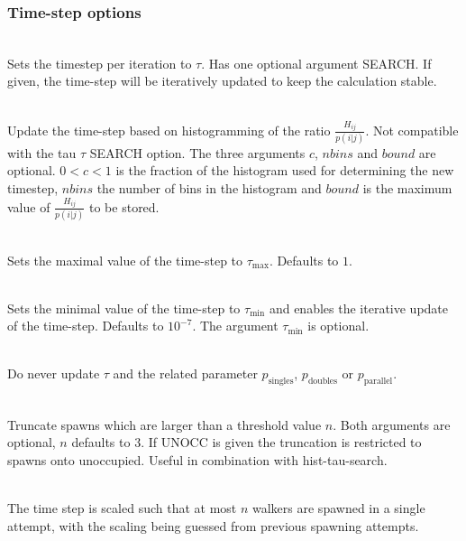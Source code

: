 \documentclass[a4paper,notitlepage,dvipsnames]{scrreprt}
\newcommand\codeitem[1]{\needspace{1.5\baselineskip}\item[\textnormal{\ttfamily #1 \nopagebreak}] \hfill \\ \nopagebreak}
\begin{document}
  \subsubsection{Time-step options}
  \begin{description}
    \codeitem{\textcolor{mred}{tau $\tau$} SEARCH}
    Sets the timestep per iteration to $\tau$. Has one optional argument
    SEARCH. If given, the time-step will be iteratively updated to keep the
    calculation stable.
    \codeitem{\textcolor{oblue}{hist-tau-search $c$ $nbins$ $bound$}}
    Update the time-step based on histogramming of the ratio
    $\frac{H_{ij}}{p(i|j)}$. Not compatible with the tau $\tau$ SEARCH
    option. The three arguments $c$, $nbins$ and $bound$ are
    optional. $0<c<1$ is the fraction of the histogram used for determining
    the new timestep, $nbins$ the number of bins in the histogram and $bound$
    is the maximum value of $\frac{H_{ij}}{p(i|j)}$ to be stored.
    \codeitem{\textcolor{oblue}{max-tau $\tau_\text{max}$}}
    Sets the maximal value of the time-step to $\tau_\text{max}$. Defaults to
    $1$.
    \codeitem{min-tau $\tau_\text{min}$}
    Sets the minimal value of the time-step to $\tau_\text{min}$ and enables
    the iterative update of the time-step. Defaults to
    $10^{-7}$. The argument $\tau_\text{min}$ is optional.
    \codeitem{keepTauFixed}
    Do never update $\tau$ and the related parameter $p_\text{singles}$,
    $p_\text{doubles}$ or $p_\text{parallel}$.
    \codeitem{truncate-spawns $n$ UNOCC}
    Truncate spawns which are larger than a threshold value $n$. Both
    arguments are optional, $n$ defaults to $3$. If UNOCC is given the
    truncation is restricted to spawns onto unoccupied. Useful in combination
    with hist-tau-search.
    \codeitem{maxWalkerBloom $n$}
    The time step is scaled such that at most $n$ walkers are spawned in a
    single attempt, with the scaling being guessed from previous spawning attempts.
  \end{description}
\end{document}
